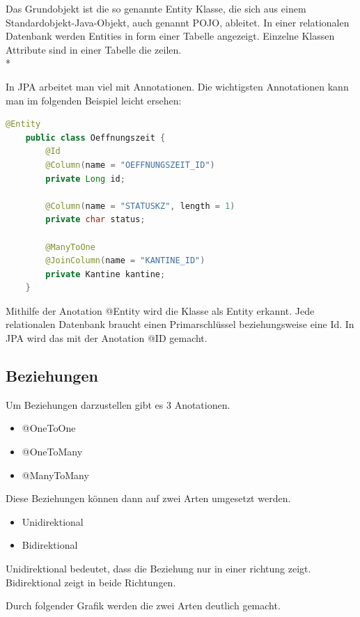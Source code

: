 Das Grundobjekt ist die so genannte Entity Klasse, die sich aus einem Standardobjekt-Java-Objekt, auch genannt POJO, ableitet. In einer relationalen Datenbank
werden Entities in form einer Tabelle angezeigt. Einzelne Klassen Attribute sind in einer Tabelle die zeilen. \cite{JPA-Entity} \\*

In JPA arbeitet man viel mit Annotationen. Die wichtigsten Annotationen kann man im folgenden Beispiel leicht ersehen:

\begin{lstlisting}[language=Java,caption=JPA Entity,label=lst:impl:foo]
    @Entity
    public class Oeffnungszeit {
        @Id
        @Column(name = "OEFFNUNGSZEIT_ID")
        private Long id;

        @Column(name = "STATUSKZ", length = 1)
        private char status;

        @ManyToOne
        @JoinColumn(name = "KANTINE_ID")
        private Kantine kantine;
    }
\end{lstlisting}

Mithilfe der Anotation @Entity wird die Klasse als Entity erkannt. Jede relationalen Datenbank braucht einen Primarschlüssel beziehungsweise eine Id.
In JPA wird das mit der Anotation @ID gemacht.

\subsection{Beziehungen}
\author{David Ignjatovic} 

Um Beziehungen darzustellen gibt es 3 Anotationen.

\begin{itemize}
    \item @OneToOne
    \item @OneToMany
    \item @ManyToMany
\end{itemize}

Diese Beziehungen können dann auf zwei Arten umgesetzt werden.

\begin{itemize}
    \item Unidirektional
    \item Bidirektional
\end{itemize}

Unidirektional bedeutet, dass die Beziehung nur in einer richtung zeigt. Bidirektional zeigt in beide Richtungen.

Durch folgender Grafik werden die zwei Arten deutlich gemacht.

